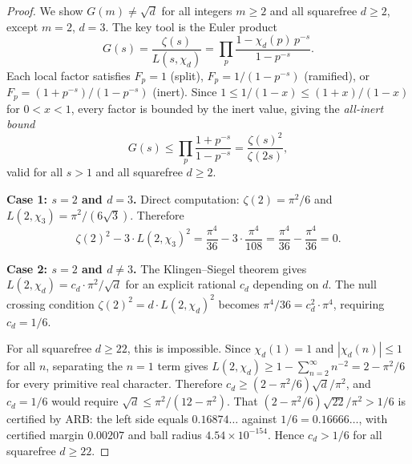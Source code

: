 \documentclass[12pt,reqno]{amsart}
\theoremstyle{plain}
\theoremstyle{definition}
\theoremstyle{remark}
\begin{document}
\begin{proof}
We show $G(m) \neq \sqrt{d}$ for all integers $m \geq 2$ and all squarefree $d \geq 2$, except $m = 2$, $d = 3$.  The key tool is the Euler product
\[
  G(s) = \frac{\zeta(s)}{L(s,\chi_d)} = \prod_p \frac{1 - \chi_d(p)\,p^{-s}}{1 - p^{-s}}.
\]
Each local factor satisfies $F_p = 1$ (split), $F_p = 1/(1-p^{-s})$ (ramified), or $F_p = (1+p^{-s})/(1-p^{-s})$ (inert).  Since $1 \leq 1/(1-x) \leq (1+x)/(1-x)$ for $0 < x < 1$, every factor is bounded by the inert value, giving the \emph{all-inert bound}
\begin{equation}\label{eq:all-inert}
  G(s) \leq \prod_p \frac{1+p^{-s}}{1-p^{-s}} = \frac{\zeta(s)^2}{\zeta(2s)},
\end{equation}
valid for all $s > 1$ and all squarefree $d \geq 2$.

\medskip\noindent\textbf{Case 1: $s = 2$ and $d = 3$.}
Direct computation: $\zeta(2) = \pi^2/6$ and $L(2, \chi_3) = \pi^2/(6\sqrt{3})$. Therefore
\[
\zeta(2)^2 - 3 \cdot L(2,\chi_3)^2 = \frac{\pi^4}{36} - 3 \cdot \frac{\pi^4}{108} = \frac{\pi^4}{36} - \frac{\pi^4}{36} = 0.
\]

\medskip\noindent\textbf{Case 2: $s = 2$ and $d \neq 3$.}
The Klingen--Siegel theorem gives $L(2, \chi_d) = c_d \cdot \pi^2/\sqrt{d}$ for an explicit rational $c_d$ depending on $d$. The null crossing condition $\zeta(2)^2 = d \cdot L(2,\chi_d)^2$ becomes $\pi^4/36 = c_d^2 \cdot \pi^4$, requiring $c_d = 1/6$.

For all squarefree $d \geq 22$, this is impossible.  Since $\chi_d(1) = 1$ and $|\chi_d(n)| \leq 1$ for all $n$, separating the $n = 1$ term gives $L(2, \chi_d) \geq 1 - \sum_{n=2}^\infty n^{-2} = 2 - \pi^2/6$ for every primitive real character.  Therefore $c_d \geq (2 - \pi^2/6)\sqrt{d}/\pi^2$, and $c_d = 1/6$ would require $\sqrt{d} \leq \pi^2/(12 - \pi^2)$.  That $(2 - \pi^2/6)\sqrt{22}/\pi^2 > 1/6$ is certified by ARB: the left side equals $0.16874\ldots$ against $1/6 = 0.16666\ldots$, with certified margin $0.00207$ and ball radius $4.54 \times 10^{-154}$.  Hence $c_d > 1/6$ for all squarefree $d \geq 22$.


\end{proof}
\end{document}
